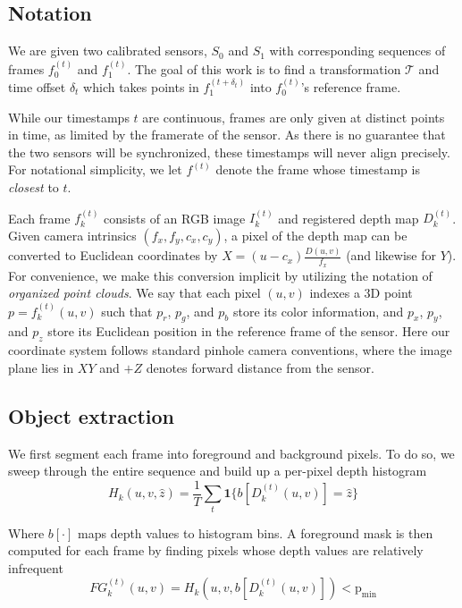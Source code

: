 \documentclass[letterpaper, 10 pt, conference]{ieeeconf}  %
\begin{document}
\subsection{Notation}

We are given two calibrated sensors, $S_0$ and $S_1$ with corresponding sequences of frames $f_0^{(t)}$ and $f_1^{(t)}$. 
The goal of this work is to find a transformation $\mathcal{T}$ and time offset $\delta_t$ which takes points in $f_1^{(t+\delta_t)}$ into $f_0^{(t)}$'s reference frame. 

While our timestamps $t$ are continuous, frames are only given at distinct points in time, as limited by the framerate of the sensor. 
As there is no guarantee that the two sensors will be synchronized, these timestamps will never align precisely. 
For notational simplicity, we let $f^{(t)}$ denote the frame whose timestamp is \emph{closest} to $t$.

Each frame $f_k^{(t)}$ consists of an RGB image $I_k^{(t)}$ and registered depth map $D_k^{(t)}$. Given camera intrinsics 
$(f_x,f_y,c_x,c_y)$, a pixel of the depth map can be converted to Euclidean coordinates by $X = (u-c_x)\frac{D(u,v)}{f_x}$ (and likewise for $Y$). 
For convenience, we make this conversion implicit by utilizing the notation of \emph{organized point clouds}.
We say that each pixel $(u,v)$ indexes a 3D point $p = f_k^{(t)}(u,v)$ such that $p_r$, $p_g$, and $p_b$ store its color information, and $p_x$, $p_y$, and $p_z$ store its Euclidean 
position in the reference frame of the sensor. Here our coordinate system follows standard
pinhole camera conventions, where the image plane lies in $XY$ and $+Z$ denotes forward distance from the sensor.

\subsection{Object extraction}

We first segment each frame into foreground and background pixels. To do so, we sweep through the entire sequence and build up a per-pixel depth histogram
\begin{equation*}
  H_{k}(u, v, \hat{z}) = \frac{1}{T} \sum\limits_{t} \textbf{1}\{ b[D_{k}^{(t)}(u,v)] = \hat{z} \}
\end{equation*}

Where $b[\cdot]$ maps depth values to histogram bins. A foreground mask is then computed for each frame by finding pixels whose depth values are relatively infrequent
\begin{equation*}
  FG_k^{(t)}(u,v) = H_{k}(u, v, b[D_{k}^{(t)}(u,v)]) < \text{p}_\text{min}
\end{equation*}
\end{document}
